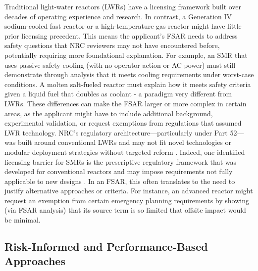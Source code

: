 \documentclass[5p,authoryear]{elsarticle}
\begin{document}
Traditional light-water reactors (LWRs) have a licensing framework built over decades of operating experience and research. In contrast, a Generation IV sodium-cooled fast reactor or a high-temperature gas reactor might have little prior licensing precedent. This means the applicant's FSAR needs to address safety questions that NRC reviewers may not have encountered before, potentially requiring more foundational explanation. For example, an SMR that uses passive safety cooling (with no operator action or AC power) must still demonstrate through analysis that it meets cooling requirements under worst-case conditions. A molten salt-fueled reactor must explain how it meets safety criteria given a liquid fuel that doubles as coolant - a paradigm very different from LWRs. These differences can make the FSAR larger or more complex in certain areas, as the applicant might have to include additional background, experimental validation, or request exemptions from regulations that assumed LWR technology. NRC's regulatory architecture—particularly under Part 52—was built around conventional LWRs and may not fit novel technologies or modular deployment strategies without targeted reform  \cite{Righetti2025}. Indeed, one identified licensing barrier for SMRs is the prescriptive regulatory framework that was developed for conventional reactors and may impose requirements not fully applicable to new designs \cite{Sam2023}. In an FSAR, this often translates to the need to justify alternative approaches or criteria. For instance, an advanced reactor might request an exemption from certain emergency planning requirements by showing (via FSAR analysis) that its source term is so limited that offsite impact would be minimal.

\subsection{Risk-Informed and Performance-Based Approaches}
\vspace{0.2cm}
\end{document}
